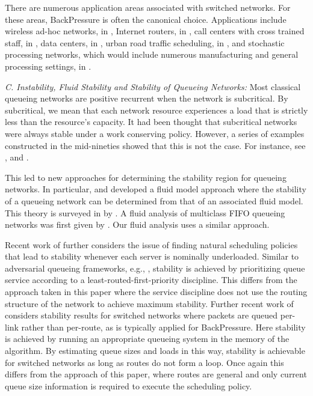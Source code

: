 \documentclass{amsart}
\begin{document}
 
There are numerous application areas associated with switched networks. For these areas, BackPressure is often the canonical choice. Applications  include
 wireless ad-hoc networks, in \cite{TaEp92},
 Internet routers, in \cite{MMAW99},
 call centers with cross trained staff, in \cite{MaSt04},
 data centers, in \cite{ShWi11},
 urban road traffic scheduling, in \cite{Va13}, and
 stochastic processing networks, which would include numerous manufacturing and general processing settings, in \cite{DaLi05}.

\emph{C. Instability, Fluid Stability and Stability of Queueing Networks:}
Most classical queueing networks are positive recurrent when the network is subcritical.  By subcritical, we mean that each network resource experiences a load that is strictly less than the resource's capacity. It had been thought that subcritical networks were always stable under a work conserving policy. However, a series of examples constructed in the mid-nineties showed that this is not the case.   For instance, see \cite{LuKu91}, \cite{RySt92} and \cite{Br94}.

This led to new approaches for determining the stability region for queueing networks. In particular, \cite{RySt92} and \cite{Da95} developed a fluid model approach where the stability of a queueing network can be determined from that of an associated fluid model. This theory is surveyed in by \cite{Br08}.
A fluid analysis of multiclass FIFO queueing networks was first given by \cite{Br96a}. Our fluid analysis uses a similar approach.

Recent work of \cite{DiSh13} further considers the issue of finding natural scheduling policies that lead to stability whenever each server is nominally underloaded. Similar to adversarial queueing frameworks, e.g., \cite{BKRSW01}, stability is achieved by prioritizing queue service according to a least-routed-first-priority discipline.  
This differs from the approach taken in this paper where the service discipline does not use the routing structure of the network  to achieve maximum stability.
Further recent work of \cite{JJS13} considers stability results for switched networks where packets are queued per-link rather than per-route, as is typically applied for BackPressure. Here stability is achieved by running an appropriate {queueing system} in the memory of the algorithm. By estimating queue sizes and loads in this way, stability is achievable for switched networks as long as routes do not form a loop. Once again this differs from the approach of this paper, where routes are general and only current queue size information is required to execute the scheduling policy.
\end{document}
